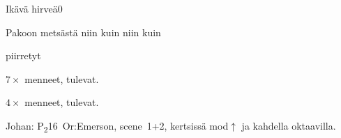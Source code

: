 \documentclass[12pt,a4paper]{article}
\begin{document}
\begin{mysong}{Ikävä hirveä}{0}
\begin{SBChorus}
Pakoon  metsästä niin kuin  niin kuin
\end{SBChorus}

\begin{SBVerse*}
   
   
\end{SBVerse*}

\begin{SBVerse}
   piirretyt

$7\times$   menneet, 
 tulevat.

    
  

$4\times$   menneet, 
 tulevat.
\end{SBVerse}


{\SBLyricNoteFont Johan: P\textsubscript{2}16~Or:Emerson, scene~1+2, kertsissä
mod$\uparrow$ ja kahdella oktaavilla.}

\end{mysong}
\end{document}
